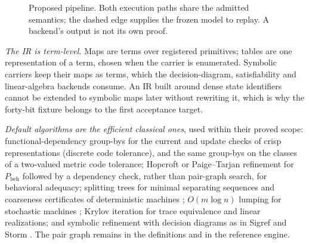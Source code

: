 \documentclass[11pt]{article}
\newcommand{\Pbeh}{P_{\mathrm{beh}}}
\theoremstyle{definition}
\theoremstyle{plain}
\begin{document}
\begin{figure}[ht]
\centering\small
{}
\caption{Proposed pipeline. Both execution paths share the admitted semantics; the dashed edge
supplies the frozen model to replay. A backend's output is not its own proof.}
\end{figure}

\emph{The IR is term-level.} Maps are terms over registered primitives; tables are one
representation of a term, chosen when the carrier is enumerated. Symbolic carriers keep their maps
as terms, which the decision-diagram, satisfiability and linear-algebra backends consume. An IR
built around dense state identifiers cannot be extended to symbolic maps later without rewriting
it, which is why the forty-bit fixture belongs to the first acceptance target.

\emph{Default algorithms are the efficient classical ones}, used within their proved scope:
functional-dependency group-bys for the current and update checks of crisp representations
(discrete code tolerance), and the same group-bys on the classes of a two-valued metric code
tolerance; Hopcroft or Paige--Tarjan
refinement for $\Pbeh$ followed by a dependency check, rather than pair-graph search, for
behavioral adequacy; splitting trees for minimal separating sequences and coarseness certificates of
deterministic machines \cite{smetsers}; $O(m\log n)$ lumping for stochastic machines
\cite{derisavi,valmari}; Krylov iteration for trace equivalence and linear realizations; and
symbolic refinement with decision diagrams as in Sigref and Storm \cite{sigref,storm}. The pair
graph remains in the definitions and in the reference engine.
\end{document}
